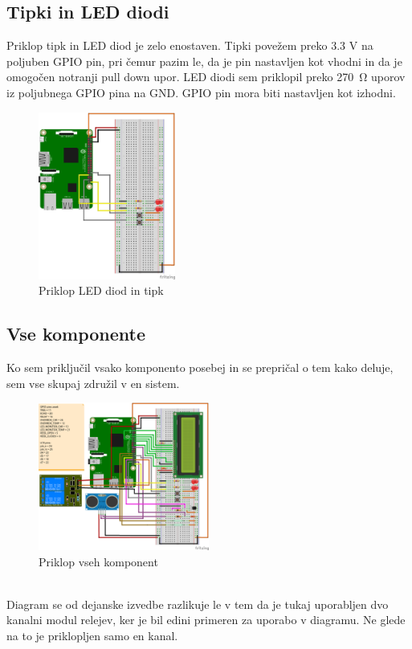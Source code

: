 \documentclass[11pt]{article}
\begin{document}
\subsection{Tipki in LED diodi}
Priklop tipk in LED diod je zelo enostaven. Tipki povežem preko 3.3 V na poljuben GPIO pin, pri čemur pazim le, da je pin nastavljen kot vhodni in da je omogočen notranji pull down upor.
LED diodi sem priklopil preko \SI{270}{\ohm} uporov iz poljubnega GPIO pina na GND. GPIO pin mora biti nastavljen kot izhodni.
\begin{figure}[h]
\centering
\includegraphics[width=0.4\textwidth]{images/smartGarage_LED_button_bb.png}
\caption{Priklop LED diod in tipk}
\end{figure}

\subsection{Vse komponente}
Ko sem priključil vsako komponento posebej in se prepričal o tem kako deluje, sem vse skupaj združil v en sistem.
\begin{figure}[h]
\centering
\includegraphics[width=0.5\textwidth]{images/smartGarageComplete_bb.png}
\caption{Priklop vseh komponent}
\end{figure}\\
Diagram se od dejanske izvedbe razlikuje le v tem da je tukaj uporabljen dvo kanalni modul relejev, ker je bil edini primeren za uporabo v diagramu. Ne glede na to je priklopljen samo en kanal.
\end{document}
